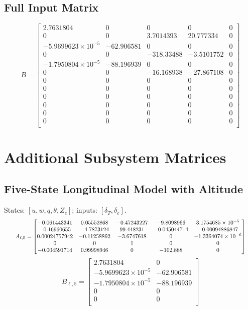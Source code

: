 \documentclass[a4paper,11pt]{article}
\newcommand{\de}{\delta_e}
\newcommand{\dt}{\delta_T}
\begin{document}
\subsection{Full Input Matrix}\begin{equation}B=\begin{bmatrix}
2.7631804 & 0 & 0 & 0 & 0 \\
0 & 0 & 3.7014393 & 20.777334 & 0 \\
-5.9699623\times10^{-5} & -62.906581 & 0 & 0 & 0 \\
0 & 0 & -318.33488 & -3.5101752 & 0 \\
-1.7950804\times10^{-5} & -88.196939 & 0 & 0 & 0 \\
0 & 0 & -16.168938 & -27.867108 & 0 \\
0 & 0 & 0 & 0 & 0 \\
0 & 0 & 0 & 0 & 0 \\
0 & 0 & 0 & 0 & 0 \\
0 & 0 & 0 & 0 & 0 \\
0 & 0 & 0 & 0 & 0 \\
0 & 0 & 0 & 0 & 0 \\
\end{bmatrix}\end{equation}

\section{Additional Subsystem Matrices}
\subsection{Five-State Longitudinal Model with Altitude}
States: $[u,w,q,\theta,Z_e]$; inputs: $[\dt,\de]$.
\begin{equation}\resizebox{0.95\linewidth}{!}{$A_{\ell,5}=\begin{bmatrix}
-0.061443341 & 0.05552868 & -0.47243227 & -9.8098966 & 3.1754685\times10^{-5} \\
-0.16960655 & -4.7873124 & 99.448231 & -0.045044714 & -0.00094886847 \\
0.00024757942 & -0.11258862 & -3.6747618 & 0 & -1.3364074\times10^{-6} \\
0 & 0 & 1 & 0 & 0 \\
-0.004591714 & 0.99998946 & 0 & -102.888 & 0 \\
\end{bmatrix}$}\end{equation}
\begin{equation}B_{\ell,5}=\begin{bmatrix}
2.7631804 & 0 \\
-5.9699623\times10^{-5} & -62.906581 \\
-1.7950804\times10^{-5} & -88.196939 \\
0 & 0 \\
0 & 0 \\
\end{bmatrix}\end{equation}
\end{document}

